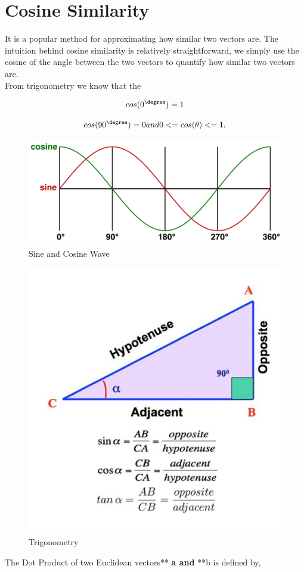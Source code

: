 \documentclass[11pt]{article}
\begin{document}
\section{Cosine Similarity}
\label{sec:org02df2d9}
It is a popular method for approximating how similar two vectors are.
The intuition behind cosine similarity is relatively straightforward, we
simply use the cosine of the angle between the two vectors to quantify
how similar two vectors are.\\
From trigonometry we know that the

$$
cos(0^\degree) = 1
$$

$$
cos(90^\degree) = 0 \space and \space 0 <= cos(\theta) <= 1.
$$

\begin{figure}[htbp]
\centering
\includegraphics[width=.9\linewidth]{./data/sine-cosine.png}
\caption{\label{fig:org9b304d4}Sine and Cosine Wave}
\end{figure}

\begin{figure}[htbp]
\centering
\includegraphics[width=.9\linewidth]{./data/cosine_sine_tan.jpeg }
\caption{\label{fig:orgec8a023}Trigonometry}
\end{figure}
The Dot Product of two Euclidean vectors** \textbf{a and} **b is defined by,
\end{document}
